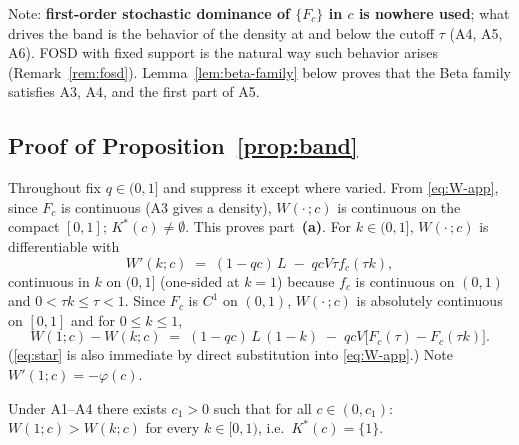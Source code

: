Note: \textbf{first-order stochastic dominance of $\{F_c\}$ in $c$ is nowhere used};
what drives the band is the behavior of the density at and below the cutoff $\tau$ (A4,
A5, A6). FOSD with fixed support is the natural way such behavior arises
(Remark~\ref{rem:fosd}). Lemma~\ref{lem:beta-family} below proves that the Beta family
satisfies A3, A4, and the first part of A5.

\subsection*{Proof of Proposition~\ref{prop:band}}

Throughout fix $q \in (0,1]$ and suppress it except where varied. From
\eqref{eq:W-app}, since $F_c$ is continuous (A3 gives a density), $W(\cdot\,; c)$ is
continuous on the compact $[0,1]$; $K^*(c) \neq \emptyset$. This proves
part~\textbf{(a)}. For $k \in (0,1]$, $W(\cdot\,; c)$ is differentiable with
\begin{equation}
W'(k; c) \;=\; (1 - qc)\,L \;-\; qcV\tau f_c(\tau k),
\tag{D}\label{eq:D}
\end{equation}
continuous in $k$ on $(0,1]$ (one-sided at $k = 1$) because $f_c$ is continuous on
$(0,1)$ and $0 < \tau k \le \tau < 1$. Since $F_c$ is $C^1$ on $(0,1)$,
$W(\cdot\,; c)$ is absolutely continuous on $[0,1]$ and for $0 \le k \le 1$,
\begin{equation}
W(1; c) - W(k; c) \;=\; (1 - qc)\,L\,(1 - k) \;-\; qcV\bigl[F_c(\tau) - F_c(\tau k)\bigr].
\tag{$\star$}\label{eq:star}
\end{equation}
(\eqref{eq:star} is also immediate by direct substitution into \eqref{eq:W-app}.) Note
$W'(1; c) = -\varphi(c)$.

\begin{lemma}\label{lem:low}
Under A1--A4 there exists $c_1 > 0$ such that for all $c \in (0, c_1)$:
$W(1; c) > W(k; c)$ for every $k \in [0,1)$, i.e.\ $K^*(c) = \{1\}$.
\end{lemma}

